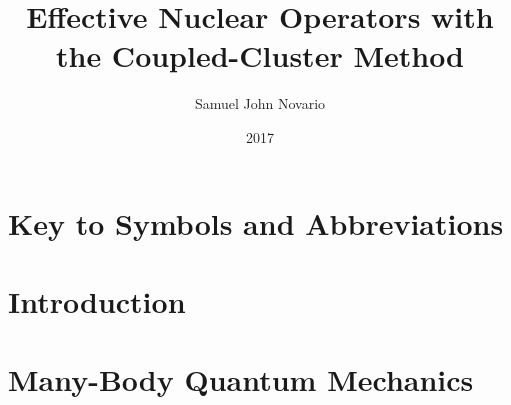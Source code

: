\documentclass[dissertation]{msudissertation}
\author{Samuel John Novario}
\title{Effective Nuclear Operators with the Coupled-Cluster Method}
\date{2017}
\begin{document}
\frontmatter
\maketitle

\tableofcontents
\listoftables
\listoffigures

\chapter{Key to Symbols and Abbreviations}


\mainmatter

\chapter{Introduction} \label{chapter:introduction}


\chapter{Many-Body Quantum Mechanics} \label{chapter:manybody}



\renewcommand{\bibname}{References}

\end{document}
